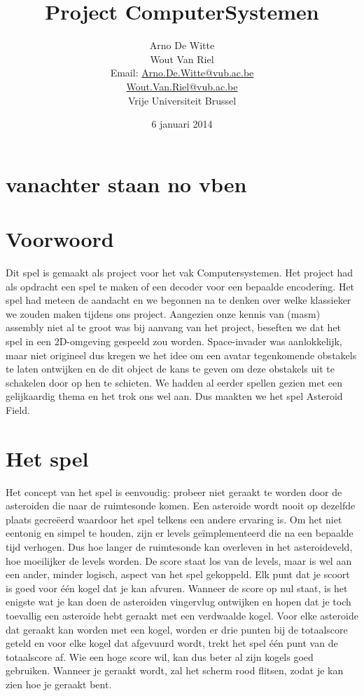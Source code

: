 \documentclass{article}
\title{Project ComputerSystemen}
\author{Arno De Witte \\Wout Van Riel  \\Email: \href{mailto:Arno.De.Witte@vub.ac.be}{Arno.De.Witte@vub.ac.be} \\ \href{mailto:Wout.Van.Riel@vub.ac.be}{Wout.Van.Riel@vub.ac.be} \\
Vrije Universiteit Brussel}
\date{6 januari 2014}
\begin{document}
\maketitle
\newpage
\tableofcontents
\newpage

\section{vanachter staan no vben}


\section{Voorwoord}
Dit spel is gemaakt als project voor het vak Computersystemen. %
Het project had als opdracht een spel te maken of een decoder voor een bepaalde encodering.
Het spel had meteen de aandacht en we begonnen na te denken over welke klassieker we zouden maken tijdens ons project.
Aangezien onze kennis van (masm) assembly niet al te groot was bij aanvang van het project, beseften we dat het spel in een 2D-omgeving gespeeld zou worden.
Space-invader was aanlokkelijk, maar niet origineel dus kregen we het idee om een avatar tegenkomende obstakels te laten ontwijken en de dit object de kans te geven om deze obstakels uit te schakelen door op hen te schieten.
We hadden al eerder spellen gezien met een gelijkaardig thema en het trok ons wel aan. Dus maakten we het spel Asteroid Field.

\section{Het spel}\label{spel}

Het concept van het spel is eenvoudig: probeer niet geraakt te worden door de asteroiden die naar de ruimtesonde komen.
Een asteroide wordt nooit op dezelfde plaats gecreëerd waardoor het spel telkens een andere ervaring is.
Om het niet eentonig en simpel te houden, zijn er levels geïmplementeerd die na een bepaalde tijd verhogen.
Dus hoe langer de ruimtesonde kan overleven in het asteroideveld, hoe moeilijker de levels worden.
De score staat los van de levels, maar is wel aan een ander, minder logisch, aspect van het spel gekoppeld.
Elk punt dat je scoort is goed voor één kogel dat je kan afvuren.
Wanneer de score op nul staat, is het enigste wat je kan doen de asteroiden vingervlug ontwijken en hopen dat je toch toevallig een asteroide hebt geraakt met een verdwaalde kogel.
Voor elke asteroide dat geraakt kan worden met een kogel, worden er drie punten bij de totaalscore geteld en voor elke kogel dat afgevuurd wordt, trekt het spel één punt van de totaalscore af.
Wie een hoge score wil, kan dus beter al zijn kogels goed gebruiken.
Wanneer je geraakt wordt, zal het scherm rood flitsen, zodat je kan zien hoe je geraakt bent.
\end{document}

